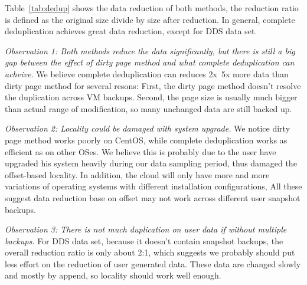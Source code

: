 Table~\ref{tab:dedup} shows the data reduction of both methods, 
the reduction ratio is defined as the original size divide by size after reduction.
In general, complete deduplication achieves great data reduction, except for DDS data set.

\emph{Observation 1: Both methods reduce the data significantly, 
but there is still a big gap between the effect of dirty page method 
and what complete deduplication can acheive.} 
We believe complete deduplication can reduces 2x~5x more data than dirty page method for several resons:
First, the dirty page method doesn't resolve the duplication across VM backups. Second, the page size
is usually much bigger than actual range of modification, so many unchanged data are still backed up.

\emph{Observation 2: Locality could be damaged with system upgrade.}
We notice dirty page method works poorly on CentOS, while complete deduplication works as efficient as on
other OSes. We believe this is probably due to the user have upgraded his system heavily during our
data sampling period, thus damaged the offset-based locality. In addition, the cloud will only have
more and more variations of operating systems with different installation configurations,
All these suggest data reduction base on offset may not work across different user snapshot backups.

\emph{Observation 3: There is not much duplication on user data if without multiple backups.}
For DDS data set, because it doesn't contain snapshot backups, the overall reduction ratio is only about 2:1,
which suggests we probably should put less effort on the reduction of user generated data. These data
are changed slowly and mostly by append, so locality should work well enough.


